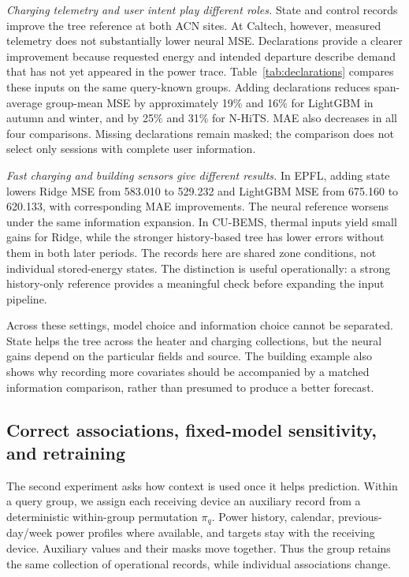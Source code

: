 \documentclass[conference,a4paper]{IEEEtran}
\begin{document}
\emph{Charging telemetry and user intent play different roles.}
State and control records improve the tree reference at both ACN sites.
At Caltech, however, measured telemetry does not substantially lower neural
MSE. Declarations provide a clearer improvement because requested energy
and intended departure describe demand that has not yet appeared in the
power trace. Table~\ref{tab:declarations} compares these inputs on the same
query-known groups. Adding declarations reduces span-average group-mean
MSE by approximately 19\% and 16\% for LightGBM in autumn and winter,
and by 25\% and 31\% for N-HiTS. MAE also decreases in all four comparisons.
Missing declarations remain masked; the comparison does not select only
sessions with complete user information.



\emph{Fast charging and building sensors give different results.}
In EPFL, adding state lowers Ridge MSE from 583.010 to 529.232 and
LightGBM MSE from 675.160 to 620.133, with corresponding MAE improvements.
The neural reference worsens under the same information expansion. In
CU-BEMS, thermal inputs yield small gains for Ridge, while the stronger
history-based tree has lower errors without them in both later periods.
The records here are shared zone conditions, not individual stored-energy
states. The distinction is useful operationally: a strong history-only
reference provides a meaningful check before expanding the input pipeline.

Across these settings, model choice and information choice cannot be
separated. State helps the tree across the heater and charging collections,
but the neural gains depend on the particular fields and source. The
building example also shows why recording more covariates should be
accompanied by a matched information comparison, rather than presumed to
produce a better forecast.

\subsection{Correct associations, fixed-model sensitivity, and retraining}
The second experiment asks how context is used once it helps prediction.
Within a query group, we assign each receiving device an auxiliary record
from a deterministic within-group permutation $\pi_q$. Power history,
calendar, previous-day/week power profiles where available, and targets
stay with the receiving device. Auxiliary values and their masks move
together. Thus the group retains the same collection of operational
records, while individual associations change.
\end{document}
